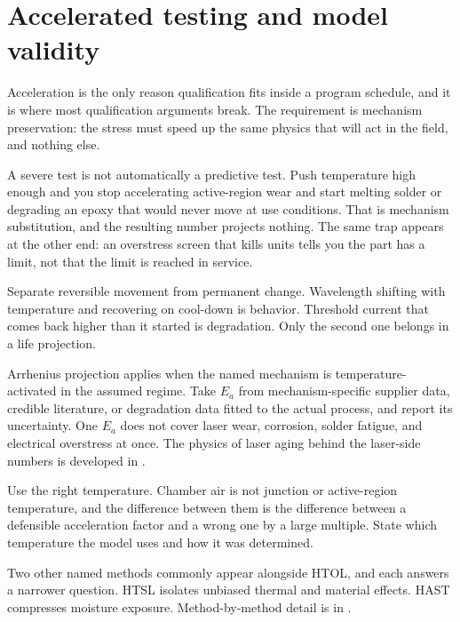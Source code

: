 \section{Accelerated testing and model validity}
\label{sec:accel-validity}

Acceleration is the only reason qualification fits inside a program schedule,
and it is where most qualification arguments break. The requirement is
mechanism preservation: the stress must speed up the same physics that will act
in the field, and nothing else.

A severe test is not automatically a predictive test. Push temperature high
enough and you stop accelerating active-region wear and start melting solder or
degrading an epoxy that would never move at use conditions. That is mechanism
substitution, and the resulting number projects nothing. The same trap appears
at the other end: an overstress screen that kills units tells you the part has
a limit, not that the limit is reached in service.

Separate reversible movement from permanent change. Wavelength shifting with
temperature and recovering on cool-down is behavior. Threshold current that
comes back higher than it started is degradation. Only the second one belongs
in a life projection.

Arrhenius projection applies when the named mechanism is
temperature-activated in the assumed regime. Take $E_a$ from mechanism-specific
supplier data, credible literature, or degradation data fitted to the actual
process, and report its uncertainty. One $E_a$ does not cover laser wear,
corrosion, solder fatigue, and electrical overstress at once. The physics of
laser aging behind the laser-side numbers is developed in
.

Use the right temperature. Chamber air is not junction or active-region
temperature, and the difference between them is the difference between a
defensible acceleration factor and a wrong one by a large multiple. State which
temperature the model uses and how it was determined.

Two other named methods commonly appear alongside HTOL, and each answers a
narrower question. HTSL isolates unbiased thermal and
material effects. HAST
compresses moisture exposure. Method-by-method detail is in
.

